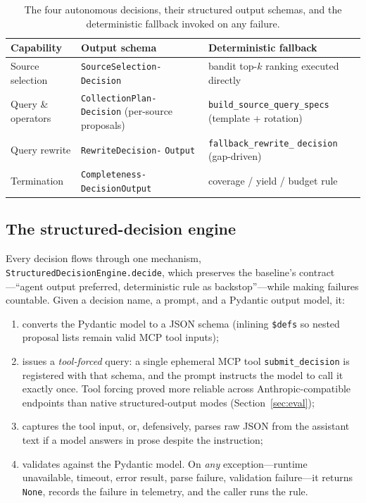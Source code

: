 \documentclass[conference]{IEEEtran}
\newcommand{\code}[1]{\texttt{\small #1}}
\begin{document}
\begin{table}[t]
\centering
\caption{The four autonomous decisions, their structured output schemas, and the deterministic fallback invoked on any failure.}
\label{tab:decisions}
\renewcommand{\arraystretch}{1.25}
\begin{tabular}{@{}p{1.55cm}p{2.45cm}p{3.0cm}@{}}
\toprule
\textbf{Capability} & \textbf{Output schema} & \textbf{Deterministic fallback} \\
\midrule
Source selection & \code{SourceSelection-} \code{Decision} & bandit top-$k$ ranking executed directly \\
Query \& operators & \code{CollectionPlan-} \code{Decision} (per-source proposals) & \code{build\_source\_query\_specs} (template + rotation) \\
Query rewrite & \code{RewriteDecision-} \code{Output} & \code{fallback\_rewrite\_} \code{decision} (gap-driven) \\
Termination & \code{Completeness-} \code{DecisionOutput} & coverage / yield / budget rule \\
\bottomrule
\end{tabular}
\end{table}

\subsection{The structured-decision engine}

Every decision flows through one mechanism, \code{StructuredDecisionEngine.decide}, which preserves the baseline's contract---``agent output preferred, deterministic rule as backstop''---while making failures countable. Given a decision name, a prompt, and a Pydantic output model, it:

\begin{enumerate}
  \item converts the Pydantic model to a JSON schema (inlining \code{\$defs} so nested proposal lists remain valid MCP tool inputs);
  \item issues a \emph{tool-forced} query: a single ephemeral MCP tool \code{submit\_decision} is registered with that schema, and the prompt instructs the model to call it exactly once. Tool forcing proved more reliable across Anthropic-compatible endpoints than native structured-output modes (Section~\ref{sec:eval});
  \item captures the tool input, or, defensively, parses raw JSON from the assistant text if a model answers in prose despite the instruction;
  \item validates against the Pydantic model. On \emph{any} exception---runtime unavailable, timeout, error result, parse failure, validation failure---it returns \code{None}, records the failure in telemetry, and the caller runs the rule.
\end{enumerate}
\end{document}
